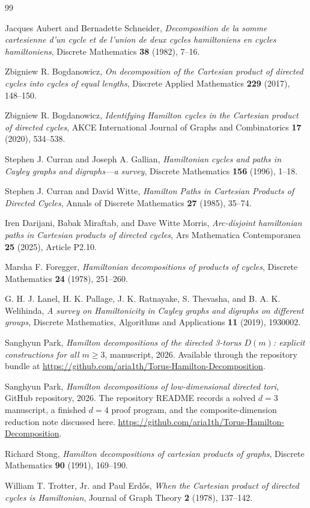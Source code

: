 \documentclass[11pt]{article}
\theoremstyle{remark}
\begin{document}
\begin{thebibliography}{99}

Jacques Aubert and Bernadette Schneider,
\emph{Decomposition de la somme cartesienne d'un cycle et de l'union de deux cycles hamiltoniens en cycles hamiltoniens},
Discrete Mathematics \textbf{38} (1982), 7--16.

Zbigniew R. Bogdanowicz,
\emph{On decomposition of the Cartesian product of directed cycles into cycles of equal lengths},
Discrete Applied Mathematics \textbf{229} (2017), 148--150.

Zbigniew R. Bogdanowicz,
\emph{Identifying Hamilton cycles in the Cartesian product of directed cycles},
AKCE International Journal of Graphs and Combinatorics \textbf{17} (2020), 534--538.

Stephen J. Curran and Joseph A. Gallian,
\emph{Hamiltonian cycles and paths in Cayley graphs and digraphs---a survey},
Discrete Mathematics \textbf{156} (1996), 1--18.

Stephen J. Curran and David Witte,
\emph{Hamilton Paths in Cartesian Products of Directed Cycles},
Annals of Discrete Mathematics \textbf{27} (1985), 35--74.

Iren Darijani, Babak Miraftab, and Dave Witte Morris,
\emph{Arc-disjoint hamiltonian paths in Cartesian products of directed cycles},
Ars Mathematica Contemporanea \textbf{25} (2025), Article P2.10.

Marsha F. Foregger,
\emph{Hamiltonian decompositions of products of cycles},
Discrete Mathematics \textbf{24} (1978), 251--260.

G. H. J. Lanel, H. K. Pallage, J. K. Ratnayake, S. Thevasha, and B. A. K. Welihinda,
\emph{A survey on Hamiltonicity in Cayley graphs and digraphs on different groups},
Discrete Mathematics, Algorithms and Applications \textbf{11} (2019), 1930002.

Sanghyun Park,
\emph{Hamilton decompositions of the directed 3-torus $D(m)$: explicit constructions for all $m \ge 3$},
manuscript, 2026.
Available through the repository bundle at \url{https://github.com/aria1th/Torus-Hamilton-Decomposition}.

Sanghyun Park,
\emph{Hamilton decompositions of low-dimensional directed tori},
GitHub repository, 2026.
The repository README records a solved $d=3$ manuscript, a finished $d=4$ proof program, and the composite-dimension reduction note discussed here.
\url{https://github.com/aria1th/Torus-Hamilton-Decomposition}.

Richard Stong,
\emph{Hamilton decompositions of cartesian products of graphs},
Discrete Mathematics \textbf{90} (1991), 169--190.

William T. Trotter, Jr. and Paul Erd\H{o}s,
\emph{When the Cartesian product of directed cycles is Hamiltonian},
Journal of Graph Theory \textbf{2} (1978), 137--142.

\end{thebibliography}
\end{document}
